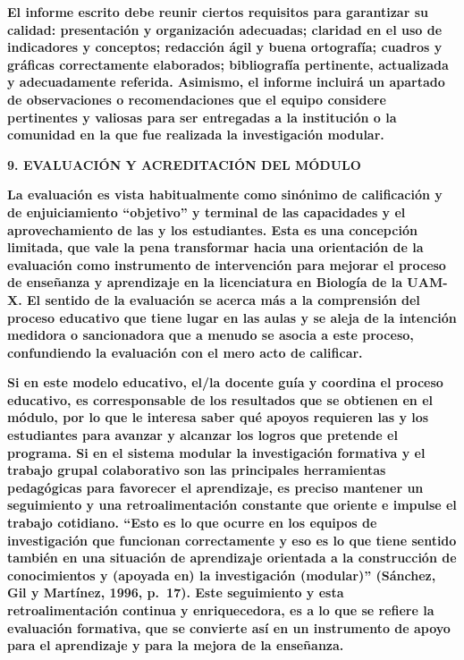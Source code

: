 \documentclass[
]{article}
\begin{document}
\textbf{El informe escrito debe reunir ciertos requisitos para
garantizar su calidad: presentación y organización adecuadas; claridad
en el uso de indicadores y conceptos; redacción ágil y buena ortografía;
cuadros y gráficas correctamente elaborados; bibliografía pertinente,
actualizada y adecuadamente referida. Asimismo, el informe incluirá un
apartado de observaciones o recomendaciones que el equipo considere
pertinentes y valiosas para ser entregadas a la institución o la
comunidad en la que fue realizada la investigación modular.}

\textbf{9. EVALUACIÓN Y ACREDITACIÓN DEL MÓDULO}

\textbf{La evaluación es vista habitualmente como sinónimo de
calificación y de enjuiciamiento ``objetivo'' y terminal de las
capacidades y el aprovechamiento de las y los estudiantes. Esta es una
concepción limitada, que vale la pena transformar hacia una orientación
de la evaluación como instrumento de intervención para mejorar el
proceso de enseñanza y aprendizaje en la licenciatura en Biología de la
UAM-X. El sentido de la evaluación se acerca más a la comprensión del
proceso educativo que tiene lugar en las aulas y se aleja de la
intención medidora o sancionadora que a menudo se asocia a este proceso,
confundiendo la evaluación con el mero acto de calificar.}

\textbf{Si en este modelo educativo, el/la docente guía y coordina el
proceso educativo, es corresponsable de los resultados que se obtienen
en el módulo, por lo que le interesa saber qué apoyos requieren las y
los estudiantes para avanzar y alcanzar los logros que pretende el
programa. Si en el sistema modular la investigación formativa y el
trabajo grupal colaborativo son las principales herramientas pedagógicas
para favorecer el aprendizaje, es preciso mantener un seguimiento y una
retroalimentación constante que oriente e impulse el trabajo cotidiano.
``Esto es lo que ocurre en los equipos de investigación que funcionan
correctamente y eso es lo que tiene sentido también en una situación de
aprendizaje orientada a la construcción de conocimientos y (apoyada en)
la investigación (modular)'' (Sánchez, Gil y Martínez, 1996, p.~17).
Este seguimiento y esta retroalimentación continua y enriquecedora, es a
lo que se refiere la evaluación formativa, que se convierte así en un
instrumento de apoyo para el aprendizaje y para la mejora de la
enseñanza.}
\end{document}
